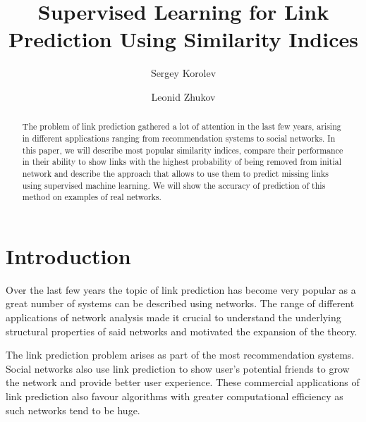 \documentclass{llncs}
\begin{document}
%
\title{Supervised Learning for Link Prediction Using Similarity Indices}
%
%
\author{Sergey Korolev \and Leonid Zhukov}
%
%
%

\maketitle              %

\begin{abstract}
The problem of link prediction gathered a lot of attention in the last few years,
arising in different applications ranging from recommendation systems to social networks.
In this paper, we will describe most popular similarity indices, compare their
performance in their ability to show links with the highest probability
of being removed from initial network and describe the approach
that allows to use them to predict missing links using supervised machine learning. 
We will show the accuracy of prediction of this method on examples of real networks.
\end{abstract}
%
\section{Introduction}
%
Over the last few years the topic of link prediction has become very popular as a great number of systems can be described using networks. The range of different applications of network analysis made it crucial to understand the underlying structural properties of said networks and motivated the expansion of the theory.

The link prediction problem arises as part of the most recommendation systems. Social networks also use link prediction to show user's potential friends to grow the network and provide better user experience. These commercial applications of link prediction also favour algorithms with greater computational efficiency as such networks tend to be huge.
\end{document}
